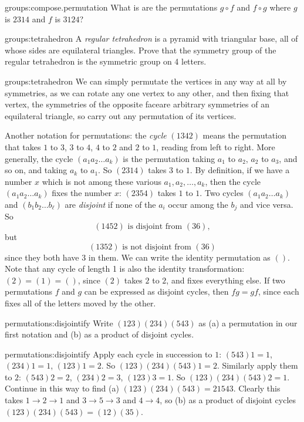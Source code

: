 \begin{problem}{groups:compose.permutation}
What is are the permutations \(g \circ f\) and \(f \circ g\) where \(g\) is \(2314\) and \(f\) is \(3124\)?
\end{problem}

\begin{problem}{groups:tetrahedron}
A \emph{regular tetrahedron} is a pyramid with triangular base, all of whose sides are equilateral triangles.
Prove that the symmetry group of the regular tetrahedron is the symmetric group on 4 letters.
\end{problem}
\begin{answer}{groups:tetrahedron}
We can simply permutate the vertices in any way at all by symmetries, as we can rotate any one vertex to any other, and then fixing that vertex, the symmetries of the opposite faceare arbitrary symmetries of an equilateral triangle, so carry out any permutation of its vertices.
\end{answer}

Another notation for permutations: the \emph{cycle} \((1 3 4 2)\) means the permutation that takes \(1\) to \(3\), \(3\) to \(4\), \(4\) to \(2\) and \(2\) to \(1\), reading from left to right.
More generally, the cycle \((a_1 a_2 \dots a_k)\) is the permutation taking \(a_1\) to \(a_2\), \(a_2\) to \(a_3\), and so on, and taking \(a_k\) to \(a_1\).
So \((2 3 1 4)\) takes \(3\) to \(1\).
By definition, if we have a number \(x\) which is not among these various \(a_1, a_2, \dots, a_k\), then the cycle \((a_1 a_2 \dots a_k)\) fixes the number \(x\):
\((2 3 5 4)\) takes \(1\) to \(1\).
Two cycles \((a_1 a_2 \dots a_k)\) and \((b_1 b_2 \dots b_{\ell})\) are \emph{disjoint} if none of the \(a_i\) occur among the \(b_j\) and vice versa.
So 
\[
(1 4 5 2) \text{ is disjoint from } (3 6),
\]
but
\[
(1 3 5 2) \text{ is not disjoint from } (3 6)
\]
since they both have \(3\) in them.
We can write the identity permutation as \(()\).
Note that any cycle of length 1 is also the identity transformation: \((2)=(1)=()\), since \((2)\) takes \(2\) to \(2\), and fixes everything else.
If two permutations \(f\) and \(g\) can be expressed as disjoint cycles, then \(fg=gf\), since each fixes all of the letters moved by the other.

\begin{problem}{permutations:disjointify}
Write \((123)(234)(543)\) as (a) a permutation in our first notation and (b) as  a product of disjoint cycles.
\end{problem}
\begin{answer}{permutations:disjointify}
Apply each cycle in succession to \(1\): \((543)1=1\), \((234)1=1\), \((123)1=2\). So \((123)(234)(543)1=2\).
Similarly apply them to \(2\): \((543)2=2\), \((234)2=3\), \((123)3=1\). So \((123)(234)(543)2=1\).
Continue in this way to find (a) \((123)(234)(543)=21543\).
Clearly this takes \(1 \to 2 \to 1\) and \(3 \to 5 \to 3\) and \(4 \to 4\), so (b) as a product of disjoint cycles
\((123)(234)(543)=(12)(35)\).
\end{answer}


